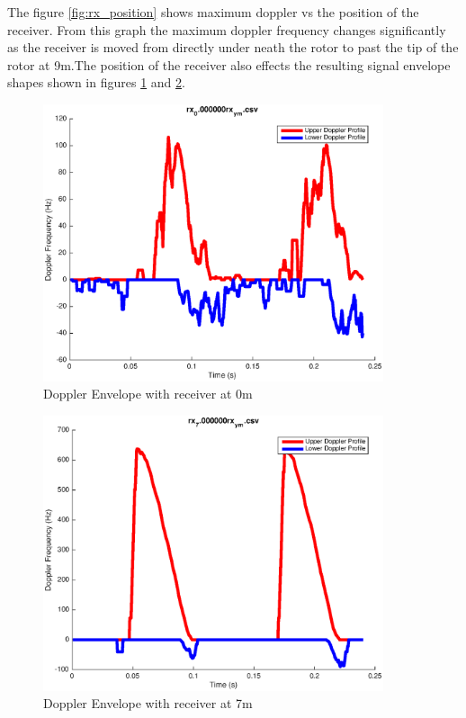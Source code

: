 The figure \ref{fig:rx_position} shows maximum doppler vs the position of the receiver. From this graph the maximum doppler frequency changes significantly as the receiver is moved from directly under neath the rotor to past the tip of the rotor at 9m.The position of the receiver also effects the resulting signal envelope shapes shown in figures \ref{fig:rx_position_0m} and \ref{fig:rx_position_7m}.

\begin{figure}
	\begin{center}
		\includegraphics[width=10cm]{images/simulation/Doppler_Receiver_0m.eps}
		\caption{Doppler Envelope with receiver at 0m}
		\label{fig:rx_position_0m}
	\end{center}
\end{figure}

\begin{figure}
	\begin{center}
		\includegraphics[width=10cm]{images/simulation/Doppler_Receiver_7m.eps}
		\caption{Doppler Envelope with receiver at 7m}
		\label{fig:rx_position_7m}
	\end{center}
\end{figure}

